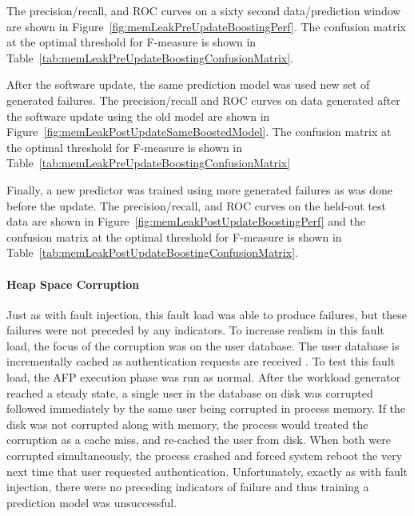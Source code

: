 The precision/recall, and \ac{ROC} curves on a sixty second data/prediction
window are shown in Figure~\ref{fig:memLeakPreUpdateBoostingPerf}.  The
confusion matrix at the optimal threshold for F-measure is shown in
Table~\ref{tab:memLeakPreUpdateBoostingConfusionMatrix}.

\figMemLeakPreUpdateBoostingPerf
\tabMemLeakPreUpdateBoostingConfusionMatrix

After the software update, the same prediction model was used new set of
generated failures.  The precision/recall and \ac{ROC} curves on data generated
after the software update using the old model are shown in
Figure~\ref{fig:memLeakPostUpdateSameBoostedModel}.  The confusion matrix at
the optimal threshold for F-measure is shown in
Table~\ref{tab:memLeakPreUpdateBoostingConfusionMatrix}

\figMemLeakPostUpdateSameBoostedModel
\tabMemLeakPostUpdateBoostingSameModelConfusionMatrix

Finally, a new predictor was trained using more generated failures as was done
before the update.  The precision/recall, and \ac{ROC} curves on the held-out
test data are shown in Figure~\ref{fig:memLeakPostUpdateBoostingPerf} and the
confusion matrix at the optimal threshold for F-measure is shown in
Table~\ref{tab:memLeakPostUpdateBoostingConfusionMatrix}.

\figMemLeakPostUpdateBoostingPerf
\tabMemLeakPostUpdateBoostingConfusionMatrix

\paragraph{Heap Space Corruption}
Just as with fault injection, this fault load was able to produce failures, but
these failures were not preceded by any indicators.  To increase realism in
this fault load, the focus of the corruption was on the user database.  The
user database is incrementally cached as authentication requests are
received \citep{russinovich2009}.  To test this fault load, the \ac{AFP}
execution phase was run as normal.  After the workload generator reached a
steady state, a single user in the database on disk was corrupted followed
immediately by the same user being corrupted in process memory.  If the disk
was not corrupted along with memory, the process would treated the corruption
as a cache miss, and re-cached the user from disk.  When both were corrupted
simultaneously, the process crashed and forced system reboot the very next time
that user requested authentication.  Unfortunately, exactly as with fault
injection, there were no preceding indicators of failure and thus training a
prediction model was unsuccessful.

